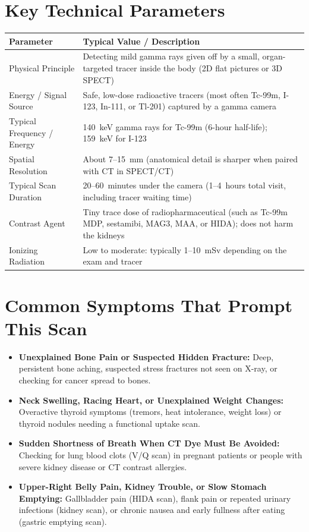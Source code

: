 \section{Key Technical Parameters}
\noindent
\begin{tabularx}{\textwidth}{@{}l X@{}}
\toprule
\textbf{Parameter} & \textbf{Typical Value / Description} \\
\midrule
Physical Principle & Detecting mild gamma rays given off by a small, organ-targeted tracer inside the body (2D flat pictures or 3D SPECT) \\
Energy / Signal Source & Safe, low-dose radioactive tracers (most often Tc-99m, I-123, In-111, or Tl-201) captured by a gamma camera \\
Typical Frequency / Energy & 140~keV gamma rays for Tc-99m (6-hour half-life); 159~keV for I-123 \\
Spatial Resolution & About 7--15~mm (anatomical detail is sharper when paired with CT in SPECT/CT) \\
Typical Scan Duration & 20--60~minutes under the camera (1--4~hours total visit, including tracer waiting time) \\
Contrast Agent & Tiny trace dose of radiopharmaceutical (such as Tc-99m MDP, sestamibi, MAG3, MAA, or HIDA); does not harm the kidneys \\
Ionizing Radiation & Low to moderate: typically 1--10~mSv depending on the exam and tracer \\
\bottomrule
\end{tabularx}

\section{Common Symptoms That Prompt This Scan}
\begin{itemize}
\item \textbf{Unexplained Bone Pain or Suspected Hidden Fracture:} Deep, persistent bone aching, suspected stress fractures not seen on X-ray, or checking for cancer spread to bones.
\item \textbf{Neck Swelling, Racing Heart, or Unexplained Weight Changes:} Overactive thyroid symptoms (tremors, heat intolerance, weight loss) or thyroid nodules needing a functional uptake scan.
\item \textbf{Sudden Shortness of Breath When CT Dye Must Be Avoided:} Checking for lung blood clots (V/Q scan) in pregnant patients or people with severe kidney disease or CT contrast allergies.
\item \textbf{Upper-Right Belly Pain, Kidney Trouble, or Slow Stomach Emptying:} Gallbladder pain (HIDA scan), flank pain or repeated urinary infections (kidney scan), or chronic nausea and early fullness after eating (gastric emptying scan).
\end{itemize}


